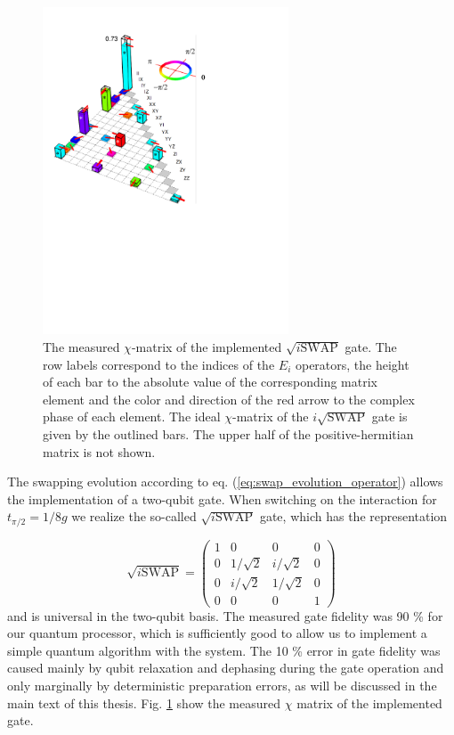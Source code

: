 \begin{figure}
		\includegraphics[width=0.65\textwidth]{./material/papers/iswap/figures/chi_matrix}
	\caption[Measured $\chi$-matrix of the $\sqrt{i\textrm{SWAP}}$ gate]{The measured $\chi$-matrix of the implemented $\sqrt{i\mathrm{SWAP}}$ gate. The row labels correspond to the indices of the $E_i$ operators, the height of each bar to the absolute value of the corresponding matrix element and the color and direction of the red arrow to the complex phase of each element. The ideal $\chi$-matrix of the $i\sqrt{\mathrm{SWAP}}$ gate is given by the outlined bars. The upper half of the positive-hermitian matrix is not shown.}
	\label{fig:gate_chi_matrix_and_errors}
\end{figure}

The swapping evolution according to eq. (\ref{eq:swap_evolution_operator}) allows the implementation of a two-qubit gate. When switching on the interaction for $t_{\pi/2} = 1/8g$ we realize the so-called $\sqrt{i\mathrm{SWAP}}$ gate, which has the representation

\begin{equation}
	\sqrt{i\mathrm{SWAP}}  =  \left( \begin{array}{cccc} 1 & 0 & 0 & 0 \\ 0 & 1/\sqrt{2} & i/\sqrt{2} & 0 \\ 0 & i/\sqrt{2} & 1/\sqrt{2} & 0 \\ 0 & 0 & 0 & 1 \end{array} \right) \label{eq:sqrt_iswap_gate}
\end{equation}
and is universal in the two-qubit basis. The measured gate fidelity was 90 \% for our quantum processor, which is sufficiently good to allow us to implement a simple quantum algorithm with the system. The 10 \% error in gate fidelity was caused mainly by qubit relaxation and dephasing during the gate operation and only marginally by deterministic preparation errors, as will be discussed in the main text of this thesis. Fig. \ref{fig:gate_chi_matrix_and_errors} show the measured $\chi$ matrix of the implemented gate.

